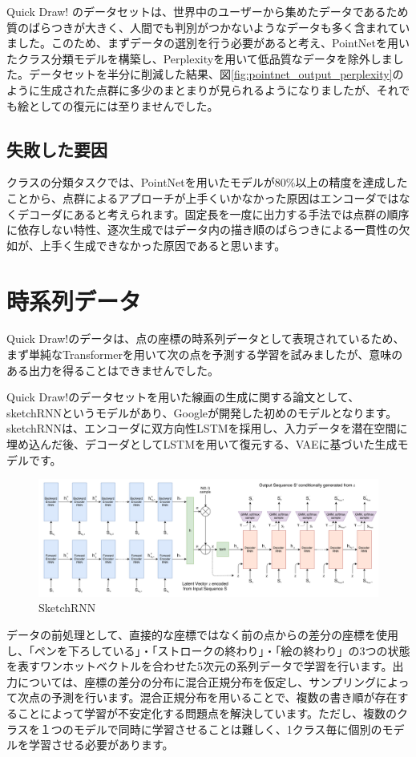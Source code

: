 Quick Draw!\cite{quickdraw} のデータセットは、世界中のユーザーから集めたデータであるため質のばらつきが大きく、人間でも判別がつかないようなデータも多く含まれていました。このため、まずデータの選別を行う必要があると考え、PointNet\cite{pointnet}を用いたクラス分類モデルを構築し、Perplexityを用いて低品質なデータを除外しました。データセットを半分に削減した結果、図\ref{fig:pointnet_output_perplexity}のように生成された点群に多少のまとまりが見られるようになりましたが、それでも絵としての復元には至りませんでした。

\subsection{失敗した要因}
クラスの分類タスクでは、PointNet\cite{pointnet}を用いたモデルが80\%以上の精度を達成したことから、点群によるアプローチが上手くいかなかった原因はエンコーダではなくデコーダにあると考えられます。固定長を一度に出力する手法では点群の順序に依存しない特性、逐次生成ではデータ内の描き順のばらつきによる一貫性の欠如が、上手く生成できなかった原因であると思います。

\section{時系列データ}
Quick Draw!\cite{quickdraw}のデータは、点の座標の時系列データとして表現されているため、まず単純なTransformerを用いて次の点を予測する学習を試みましたが、意味のある出力を得ることはできませんでした。

Quick Draw!\cite{quickdraw}のデータセットを用いた線画の生成に関する論文として、sketchRNN\cite{sketchRNN}というモデルがあり、Googleが開発した初めのモデルとなります。sketchRNN\cite{sketchRNN}は、エンコーダに双方向性LSTMを採用し、入力データを潜在空間に埋め込んだ後、デコーダとしてLSTMを用いて復元する、VAEに基づいた生成モデルです。
\begin{figure}[h]
  \centering
  \includegraphics[scale=0.45]{draw-forecast/fig/sketchrnn.png}
  \caption{SketchRNN}
  \label{fig:sketchrnn}
\end{figure}
データの前処理として、直接的な座標ではなく前の点からの差分の座標を使用し、「ペンを下ろしている」・「ストロークの終わり」・「絵の終わり」の3つの状態を表すワンホットベクトルを合わせた5次元の系列データで学習を行います。出力については、座標の差分の分布に混合正規分布を仮定し、サンプリングによって次点の予測を行います。混合正規分布を用いることで、複数の書き順が存在することによって学習が不安定化する問題点を解決しています。ただし、複数のクラスを１つのモデルで同時に学習させることは難しく、1クラス毎に個別のモデルを学習させる必要があります。

